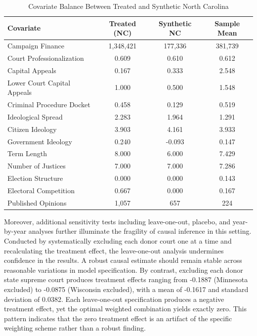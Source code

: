 \begin{table}[p]
\captionsetup{justification=raggedright, singlelinecheck=false, skip=5pt}
\caption{Covariate Balance Between Treated and Synthetic North Carolina}
\label{tab:covariate_balance}
\centering
\begin{tabular}{lccc}
\hline
\rule{0pt}{3ex}\textbf{Covariate}
& \textbf{Treated (NC)}
& \textbf{Synthetic NC}
& \textbf{Sample Mean} \\[1ex]
\hline
Campaign Finance        & 1,348,421 & 177,336 & 381,739 \\
Court Professionalization & 0.609 & 0.610 & 0.612 \\
Capital Appeals         & 0.167 & 0.333 & 2.548 \\
Lower Court Capital Appeals & 1.000 & 0.500 & 1.548 \\
Criminal Procedure Docket & 0.458 & 0.129 & 0.519 \\
Ideological Spread      & 2.283 & 1.964 & 1.291 \\
Citizen Ideology        & 3.903 & 4.161 & 3.933 \\
Government Ideology     & 0.240 & -0.093 & 0.147 \\
Term Length             & 8.000 & 6.000 & 7.429 \\
Number of Justices      & 7.000 & 7.000 & 7.286 \\
Election Structure      & 0.000 & 0.000 & 0.143 \\
Electoral Competition   & 0.667 & 0.000 & 0.167 \\
Published Opinions      & 1,057 & 657 & 224 \\
\hline
\end{tabular}
\end{table}

Moreover, additional sensitivity tests including leave-one-out, placebo,
and year-by-year analyses further illuminate the fragility of causal
inference in this setting. Conducted by systematically excluding each
donor court one at a time and recalculating the treatment effect, the
leave-one-out analysis undermines confidence in the results. A robust
causal estimate should remain stable across reasonable variations in
model specification. By contrast, excluding each donor state supreme
court produces treatment effects ranging from -0.1887 (Minnesota
excluded) to -0.0875 (Wisconsin excluded), with a mean of -0.1617 and
standard deviation of 0.0382. Each leave-one-out specification produces
a negative treatment effect, yet the optimal weighted combination yields
exactly zero. This pattern indicates that the zero treatment effect is
an artifact of the specific weighting scheme rather than a robust
finding.

